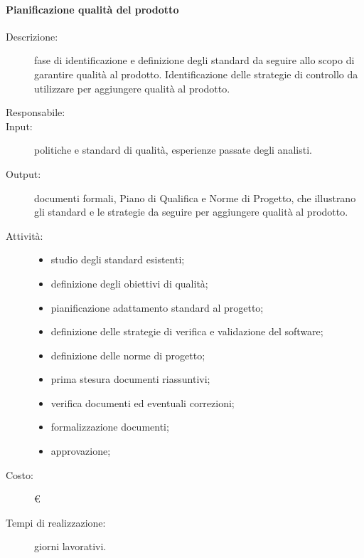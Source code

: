 \paragraph{Pianificazione qualità del prodotto}
\begin{description}
\item[Descrizione:] fase di identificazione e definizione degli standard da seguire allo scopo di garantire qualità al prodotto. Identificazione delle strategie di controllo da utilizzare per aggiungere qualità al prodotto.
\item[Responsabile:] 
\item[Input:] politiche e standard di qualità, esperienze passate degli analisti.
\item[Output:] documenti formali, Piano di Qualifica e Norme di Progetto, che illustrano gli standard e le strategie da seguire per aggiungere qualità al prodotto.
\item[Attività:]
\begin{itemize}
\item studio degli standard esistenti;
\item definizione degli obiettivi di qualità;
\item pianificazione adattamento standard al progetto;
\item definizione delle strategie di verifica e validazione del software;
\item definizione delle norme di progetto;
\item prima stesura documenti riassuntivi;
\item verifica documenti ed eventuali correzioni;
\item formalizzazione documenti;
\item approvazione;
\end{itemize}
\item[Costo:] \euro{}
\item[Tempi di realizzazione:]  giorni lavorativi.
\end{description}


